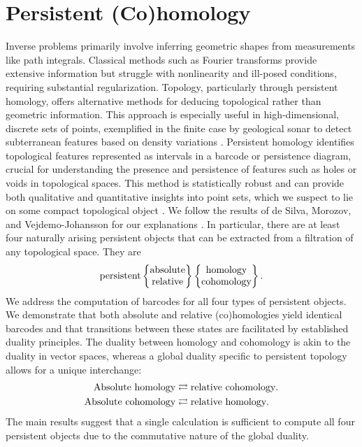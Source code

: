 \section{Persistent (Co)homology}
\label{Persistent(Co)homology}
Inverse problems primarily involve inferring geometric shapes from measurements like
path integrals. Classical methods such as Fourier transforms provide extensive
information but struggle with nonlinearity and ill-posed conditions, requiring substantial
regularization. Topology, particularly through persistent homology, offers
alternative methods for deducing topological rather than geometric information. This
approach is especially useful in high-dimensional, discrete sets of points, exemplified
in the finite case by geological sonar to detect subterranean features based on density
variations \cite[\S 1]{de2011dualities}. Persistent homology identifies
topological features represented as intervals in a barcode or persistence
diagram, crucial for understanding the presence and persistence of features such
as holes or voids in topological spaces. This method is statistically robust and
can provide both qualitative and quantitative insights into point sets, which we
suspect to lie on some compact topological object \cite{chazal2014persistence,chazal2009proximity}. We follow the results
of de Silva, Morozov, and Vejdemo-Johansson for our explanations \cite[\S 1]{de2011dualities}. In particular, there are at least four naturally arising persistent objects that
can be extracted from a filtration of any topological space.
They are
\begin{equation*}
	\text{persistent}
	\begin{Bmatrix}
		\text{absolute} \\
		\text{relative}
	\end{Bmatrix}
	\begin{Bmatrix}
		\text{homology\index{homology}}   \\
		\text{cohomology\index{cohomology}}
	\end{Bmatrix}.
\end{equation*}
We address the computation of barcodes for all four types of persistent
objects. We demonstrate that both absolute and relative (co)homologies yield identical
barcodes and that transitions between these states are facilitated by established
duality principles. The duality between homology and cohomology is akin to the
duality in vector spaces, whereas a global duality specific to persistent topology
allows for a unique interchange:
\begin{align*}
	\text{Absolute homology\index{homology}}   & \rightleftarrows \text{relative cohomology\index{cohomology}.} \\
	\text{Absolute cohomology\index{cohomology}} & \rightleftarrows \text{relative homology\index{homology}.}
\end{align*}
The main results suggest that a single calculation is sufficient
to compute all four persistent objects due to the commutative nature of the global
duality.

